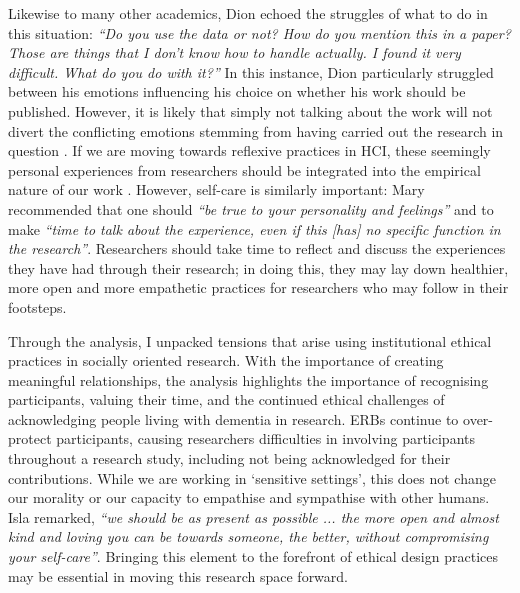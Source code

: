 Likewise to many other academics, Dion echoed the struggles of what to do in this situation: \textit{``Do you use the data or not? How do you mention this in a paper? Those are things that I don’t know how to handle actually. I found it very difficult. What do you do with it?''} In this instance, Dion particularly struggled between his emotions influencing his choice on whether his work should be published. However, it is likely that simply not talking about the work will not divert the conflicting emotions stemming from having carried out the research in question \citep{wacquant_for_2015}. If we are moving towards reflexive practices in HCI, these seemingly personal experiences from researchers should be integrated into the empirical nature of our work \citep{morrissey_value_2017}. However, self-care is similarly important: Mary recommended that one should \textit{``be true to your personality and feelings''} and to make \textit{``time to talk about the experience, even if this [has] no specific function in the research''}. Researchers should take time to reflect and discuss the experiences they have had through their research; in doing this, they may lay down healthier, more open and more empathetic practices for researchers who may follow in their footsteps.

Through the analysis, I unpacked tensions that arise using institutional ethical practices in socially oriented research. With the importance of creating meaningful relationships, the analysis highlights the importance of recognising participants, valuing their time, and the continued ethical challenges of acknowledging people living with dementia in research. ERBs continue to over-protect participants, causing researchers difficulties in involving participants throughout a research study, including not being acknowledged for their contributions. While we are working in ‘sensitive settings’, this does not change our morality or our capacity to empathise and sympathise with other humans. Isla remarked, \textit{``we should be as present as possible ... the more open and almost kind and loving you can be towards someone, the better, without compromising your self-care''}. Bringing this element to the forefront of ethical design practices may be essential in moving this research space forward.

